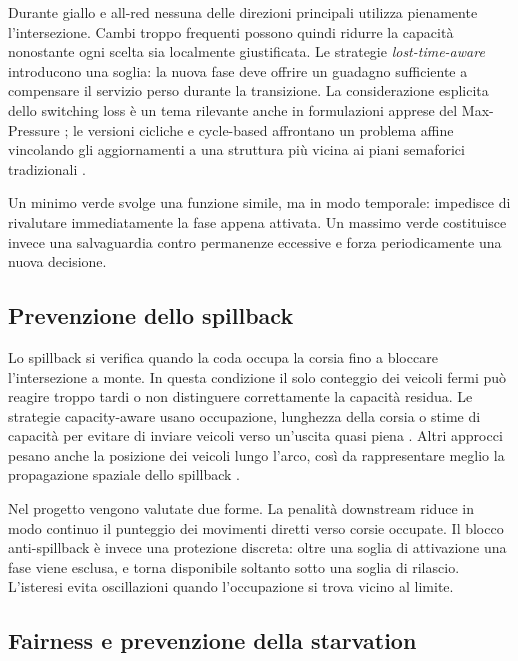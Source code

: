 \documentclass[12pt,a4paper,oneside]{report}
\numberwithin{equation}{chapter}
\begin{document}
Durante giallo e all-red nessuna delle direzioni principali utilizza pienamente
l'intersezione. Cambi troppo frequenti possono quindi ridurre la capacità
nonostante ogni scelta sia localmente giustificata. Le strategie
\emph{lost-time-aware} introducono una soglia: la nuova fase deve offrire un
guadagno sufficiente a compensare il servizio perso durante la transizione.
La considerazione esplicita dello switching loss è un tema rilevante anche in
formulazioni apprese del Max-Pressure \cite{wang2022switching}; le versioni
cicliche e cycle-based affrontano un problema affine vincolando gli
aggiornamenti a una struttura più vicina ai piani semaforici tradizionali
\cite{anderson2018cyclebased,levin2020cyclical}.

Un minimo verde svolge una funzione simile, ma in modo temporale: impedisce di
rivalutare immediatamente la fase appena attivata. Un massimo verde costituisce
invece una salvaguardia contro permanenze eccessive e forza periodicamente una
nuova decisione.

\subsection{Prevenzione dello spillback}

Lo spillback si verifica quando la coda occupa la corsia fino a bloccare
l'intersezione a monte. In questa condizione il solo conteggio dei veicoli
fermi può reagire troppo tardi o non distinguere correttamente la capacità
residua. Le strategie capacity-aware usano occupazione, lunghezza della corsia
o stime di capacità per evitare di inviare veicoli verso un'uscita quasi piena
\cite{gregoire2015capacity,noaeen2021spillback}. Altri approcci pesano anche
la posizione dei veicoli lungo l'arco, così da rappresentare meglio la
propagazione spaziale dello spillback \cite{li2019positionweighted}.

Nel progetto vengono valutate due forme. La penalità downstream riduce in modo
continuo il punteggio dei movimenti diretti verso corsie occupate. Il blocco
anti-spillback è invece una protezione discreta: oltre una soglia di
attivazione una fase viene esclusa, e torna disponibile soltanto sotto una
soglia di rilascio. L'isteresi evita oscillazioni quando l'occupazione si trova
vicino al limite.

\subsection{Fairness e prevenzione della starvation}
\end{document}
